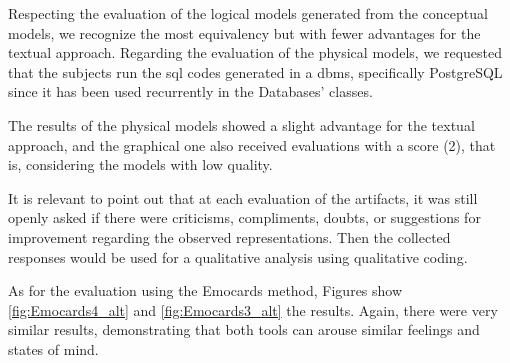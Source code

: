Respecting the evaluation of the logical models generated from the conceptual models, we recognize the most equivalency but with fewer advantages for the textual approach.
Regarding the evaluation of the physical models, we requested that the subjects run the \ac{sql} codes generated in a \ac{dbms}, specifically PostgreSQL since it has been used recurrently in the Databases' classes.

The results of the physical models showed a slight advantage for the textual approach, and the graphical one also received evaluations with a score (2), that is, considering the models with low quality.

It is relevant to point out that at each evaluation of the artifacts, it was still openly asked if there were criticisms, compliments, doubts, or suggestions for improvement regarding the observed representations.
Then the collected responses would be used for a qualitative analysis using qualitative coding.

As for the evaluation using the Emocards method, Figures show \ref{fig:Emocards4_alt} and \ref{fig:Emocards3_alt} the results.
Again, there were very similar results, demonstrating that both tools can arouse similar feelings and states of mind.

